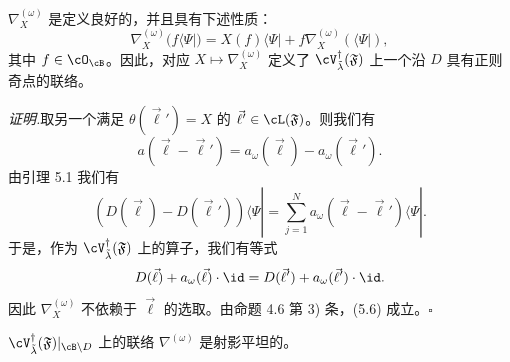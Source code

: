 \begin{proposition}[5.4]
 $\nabla^{(\omega)}_X$ 是定义良好的，并且具有下述性质：
 \begin{equation}
  \nabla^{(\omega)}_X(f\langle\Psi|)=X(f)\langle\Psi|+f\nabla^{(\omega)}_X(\langle\Psi|), \tag{5.6}
 \end{equation}
 其中 $f\in\cO_\cB$。因此，对应 $X\mapsto\nabla^{(\omega)}_X$ 定义了 $\cV^\dagger_{\tilde\lambda}(\mathfrak F)$ 上一个沿 $D$ 具有正则奇点的联络。
\end{proposition}


\noindent\textit{证明.}\quad 取另一个满足 $\theta(\vec\ell')=X$ 的 $\vec\ell'\in\cL(\mathfrak F)$。则我们有
\[
 a(\vec\ell-\vec\ell')=a_\omega(\vec\ell)-a_\omega(\vec\ell').
\]
由引理 5.1 我们有
\[
 (D(\vec\ell)-D(\vec\ell'))\langle\Psi|=\sum_{j=1}^{N}a_\omega(\vec\ell-\vec\ell')\langle\Psi|.
\]
于是，作为 $\cV^\dagger_{\tilde\lambda}(\mathfrak F)$ 上的算子，我们有等式
\[
 D(\vec\ell)+a_\omega(\vec\ell)\cdot\id=D(\vec\ell')+a_\omega(\vec\ell')\cdot\id.
\]
因此 $\nabla^{(\omega)}_X$ 不依赖于 $\vec\ell$ 的选取。由命题 4.6 第 3) 条，(5.6) 成立。\hfill$\square$

\begin{theorem}[5.5]
 $\cV^\dagger_{\tilde\lambda}(\mathfrak F)|_{\cB\setminus D}$ 上的联络 $\nabla^{(\omega)}$ 是射影平坦的。
\end{theorem}



